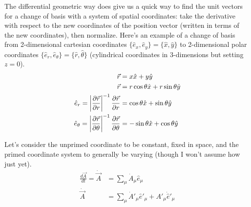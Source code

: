 \documentclass[10pt]{article}
\begin{document}
The differential geometric way does give us a quick way to find the 
unit vectors for a change of basis with a 
system of spatial coordinates: take the derivative with respect to the 
new coordinates of the position vector (written in terms of the new 
coordinates), then normalize. Here's an example of a change of basis from 
2-dimensional cartesian coordinates 
$\{\hat{e}_x,\hat{e}_y\}=\{\hat{x},\hat{y}\}$ 
to 2-dimensional polar coordinates 
$\{\hat{e}_r,\hat{e}_\theta\}=\{\hat{r},\hat{\theta}\}$
(cylindrical coordinates in 3-dimensions but setting $z=0$). 
\begin{align}
    \vec{r} &= x\hat{x} + y\hat{y} \notag\\
    \vec{r} &= r\cos\theta\hat{x} + r\sin\theta\hat{y} \notag\\
    \hat{e}_r = \left|\frac{\partial \vec{r}}{\partial r}\right|^{-1} 
        \frac{\partial \vec{r}}{\partial r} &= \cos\theta\hat{x} + 
        \sin\theta\hat{y} \\
    \hat{e}_\theta = \left|\frac{\partial \vec{r}}{\partial\theta}\right|^{-1} 
        \frac{\partial \vec{r}}{\partial\theta} &= -\sin\theta\hat{x} + 
        \cos\theta\hat{y} 
\end{align}

Let's consider the unprimed coordinate to be constant, fixed in space, 
and the primed coordinate system to generally be varying (though I won't 
assume how just yet).
\begin{align}
    \frac{d\vec{A}}{dt} = \dot{\vec{A}} &= \sum_\mu \dot{A}_\mu\hat{e}_\mu \\
    \dot{\vec{A}} &= \sum_\mu \dot{A}'_\mu\hat{e}'_\mu + 
        A'_\mu\dot{\hat{e}}'_\mu 
\end{align}
\end{document}
